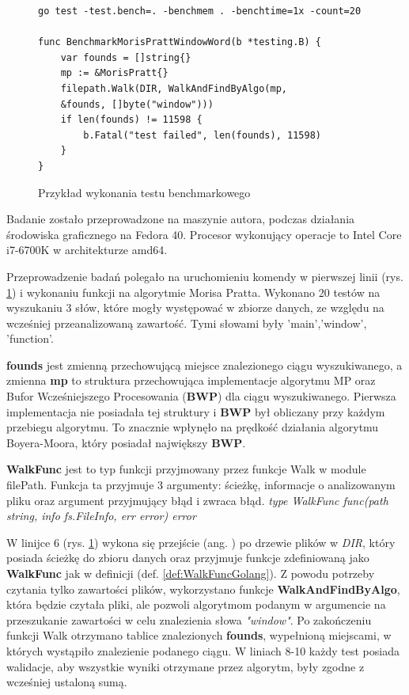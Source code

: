 \begin{figure}[htbp]
  \centering
  \begin{lstlisting}
go test -test.bench=. -benchmem . -benchtime=1x -count=20

func BenchmarkMorisPrattWindowWord(b *testing.B) {
	var founds = []string{}
	mp := &MorisPratt{}
	filepath.Walk(DIR, WalkAndFindByAlgo(mp,
    &founds, []byte("window")))
	if len(founds) != 11598 {
		b.Fatal("test failed", len(founds), 11598)
	}
}
  \end{lstlisting}
  \caption{Przykład wykonania testu benchmarkowego}
  \label{fig:code:examplePerfTest}
\end{figure}
Badanie zostało przeprowadzone na maszynie autora, podczas działania środowiska
graficznego na Fedora 40. Procesor wykonujący operacje to Intel Core i7-6700K
w architekturze amd64.

Przeprowadzenie badań polegało na uruchomieniu komendy w pierwszej linii (rys. 
\ref{fig:code:examplePerfTest}) i wykonaniu funkcji na algorytmie Morisa Pratta. 
Wykonano 20 testów na wyszukaniu 3 słów, które mogły występować w zbiorze danych,
ze względu na wcześniej przeanalizowaną zawartość. Tymi słowami były 
'main','window', 'function'.

\textbf{founds} jest zmienną przechowującą miejsce znalezionego 
ciągu wyszukiwanego, a zmienna \textbf{mp} to struktura przechowująca implementacje algorytmu MP oraz
Bufor Wcześniejszego Procesowania (\textbf{BWP}) dla ciągu wyszukiwanego. Pierwsza implementacja nie 
posiadała tej struktury i \textbf{BWP} był obliczany przy każdym przebiegu algorytmu.
 To znacznie wpłynęło na prędkość działania algorytmu Boyera-Moora, który posiadał największy \textbf{BWP}.

\begin{Definition}\label{def:WalkFuncGolang}
\textbf{WalkFunc} jest to typ funkcji przyjmowany przez funkcje Walk w module filePath.
Funkcja ta przyjmuje 3 argumenty: ścieżkę, informacje o analizowanym pliku oraz
argument przyjmujący błąd i zwraca błąd. \newline \newline
\textit{type WalkFunc func(path string, info fs.FileInfo, err error) error}
\end{Definition}

W linijce 6 (rys. \ref{fig:code:examplePerfTest}) wykona się przejście (ang. 
) po drzewie plików w \textit{DIR}, który posiada ścieżkę do 
zbioru danych oraz przyjmuje funkcje zdefiniowaną jako \textbf{WalkFunc} jak w definicji
(def. \ref{def:WalkFuncGolang}). Z powodu potrzeby czytania tylko zawartości plików,
wykorzystano funkcje \textbf{WalkAndFindByAlgo}, która będzie czytała pliki, ale 
pozwoli algorytmom podanym w argumencie na przeszukanie zawartości w celu 
znalezienia słowa \textit{"window"}. Po zakończeniu funkcji Walk otrzymano 
tablice znalezionych \textbf{founds}, wypełnioną miejscami, w których wystąpiło 
znalezienie podanego ciągu. W liniach 8-10 każdy test posiada walidacje, aby wszystkie wyniki 
otrzymane przez algorytm, były zgodne z wcześniej ustaloną sumą.

